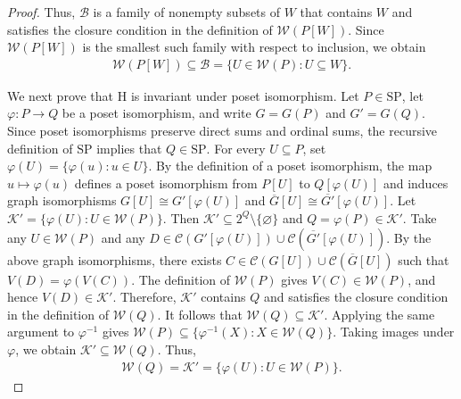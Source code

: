 \documentclass[10pt,a4paper]{amsart}
\begin{document}
\begin{proof}
Thus, $\mathcal B$ is a family of nonempty subsets of $W$
that contains $W$ and satisfies the closure condition in the definition of $\mathcal W(P[W])$.
Since $\mathcal W(P[W])$ is the smallest such family with respect to inclusion, we obtain
\begin{eqnarray*}
\mathcal W(P[W])\subseteq\mathcal B=\{U\in\mathcal W(P):U\subseteq W\}.
\end{eqnarray*}

We next prove that $\mathrm H$ is invariant under poset isomorphism.
Let $P\in\mathrm{SP}$, let $\varphi:P\to Q$ be a poset isomorphism,
and write $G=G(P)$ and $G'=G(Q)$.
Since poset isomorphisms preserve direct sums and ordinal sums,
the recursive definition of $\mathrm{SP}$ implies that $Q\in\mathrm{SP}$.
For every $U\subseteq P$, set $\varphi(U)=\{\varphi(u):u\in U\}$.
By the definition of a poset isomorphism,
the map $u\mapsto\varphi(u)$ defines a poset isomorphism from $P[U]$ to $Q[\varphi(U)]$
and induces graph isomorphisms $G[U]\cong G'[\varphi(U)]$ and
$\overline G[U]\cong\overline{G'}[\varphi(U)]$.
Let $\mathcal K'=\{\varphi(U):U\in\mathcal W(P)\}$.
Then $\mathcal K'\subseteq 2^Q\setminus\{\varnothing\}$ and $Q=\varphi(P)\in\mathcal K'$.
Take any $U\in\mathcal W(P)$ and any $D\in\mathcal C(G'[\varphi(U)])\cup\mathcal C(\overline{G'}[\varphi(U)])$.
By the above graph isomorphisms, there exists $C\in\mathcal C(G[U])\cup\mathcal C(\overline G[U])$
such that $V(D)=\varphi(V(C))$.
The definition of $\mathcal W(P)$ gives $V(C)\in\mathcal W(P)$, and hence $V(D)\in\mathcal K'$.
Therefore, $\mathcal K'$ contains $Q$ and satisfies the closure condition in the definition of $\mathcal W(Q)$.
It follows that $\mathcal W(Q)\subseteq\mathcal K'$.
Applying the same argument to $\varphi^{-1}$ gives $\mathcal W(P)\subseteq\{\varphi^{-1}(X):X\in\mathcal W(Q)\}$.
Taking images under $\varphi$, we obtain $\mathcal K'\subseteq\mathcal W(Q)$.
Thus,%
\begin{eqnarray*}
\mathcal W(Q)=\mathcal K'=\{\varphi(U):U\in\mathcal W(P)\}.
\end{eqnarray*}


\end{proof}
\end{document}
